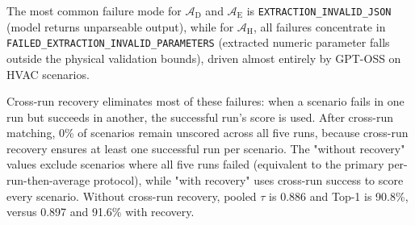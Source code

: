 \documentclass[final,3p,times]{elsarticle}
\begin{document}
The most common failure mode for $\mathcal{A}_{\text{D}}$ and $\mathcal{A}_{\text{E}}$ is \texttt{EXTRACTION\_INVALID\_JSON} (model returns unparseable output), while for $\mathcal{A}_{\text{H}}$, all failures concentrate in \texttt{FAILED\_EXTRACTION\_INVALID\_PARAMETERS} (extracted numeric parameter falls outside the physical validation bounds), driven almost entirely by GPT-OSS on HVAC scenarios.

Cross-run recovery eliminates most of these failures: when a scenario fails in one run but succeeds in another, the successful run's score is used. After cross-run matching, 0\% of scenarios remain unscored across all five runs, because cross-run recovery ensures at least one successful run per scenario. The "without recovery" values exclude scenarios where all five runs failed (equivalent to the primary per-run-then-average protocol), while "with recovery" uses cross-run success to score every scenario. Without cross-run recovery, pooled $\tau$ is 0.886 and Top-1 is 90.8\%, versus 0.897 and 91.6\% with recovery.



\FloatBarrier
\end{document}
